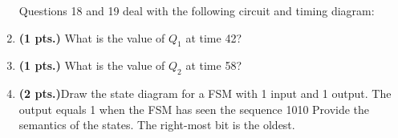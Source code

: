 \documentclass{article}
\begin{document}
\begin{enumerate}
\pagebreak

Questions 18 and 19 deal with the following circuit and timing diagram:

\begin{figure}[ht]
\centerline{}
\end{figure}

\item {\bf (1 pts.)} What is the value of $Q_1$ at time 42?

\item {\bf (1 pts.)} What is the value of $Q_2$ at time 58?

\item {\bf (2 pts.)}Draw the state diagram for a FSM with 1 input and
1 output.  The output equals 1 when the FSM has seen the sequence 1010
Provide the semantics of the states.  The right-most bit is the oldest.

\end{enumerate}
\end{document}
